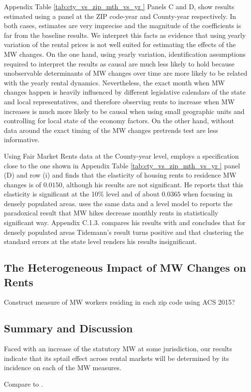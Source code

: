 Appendix Table \ref{tab:cty_vs_zip_mth_vs_yr } Panels C and D, show results estimated
using a panel at the ZIP code-year and County-year respectively. In both cases, estimates
are very imprecise and the magnitude of the coefficients is far from the baseline results. 
We interpret this facts as evidence that using yearly variation of the rental prices is not 
well suited for estimating the effects of the MW changes. On the one hand, using yearly variation, 
identification assumptions required to interpret the results as causal are much less likely 
to hold because unobservable determinants of MW changes over time are more likely to be 
related with the yearly rental dynamics. Nevertheless, the exact month when MW changes 
happen is heavily influenced by different legislative calendars of the state and local 
representatives, and therefore observing rents to increase when MW increases is much 
more likely to be causal when using small geographic units and controlling for local 
state of the economy factors. On the other hand, without data around the exact timing of the 
MW changes pretrends test are less informative.

Using Fair Market Rents data at the County-year level, \textcite{Yamagishi2019} employs a 
specification close to the one shown in Appendix Table \ref{tab:cty_vs_zip_mth_vs_yr } 
panel (D) and row (i) and finds that the elasticity of housing rents to residence MW changes 
is of $0.0150$, although his results are not significant. He reports that this elasticity is 
significant at the 10\% level and of about $0.0365$ when focusing in densely populated areas.
\textcite{Tidemann2018} uses the same data and a level model to reports the paradoxical 
result that MW hikes decrease monthly rents in statistically significant way. \textcite{Yamagishi2019} 
Appendix C.1.3. compares his results with \textcite{Tidemann2018} and concludes that for densely 
populated areas Tidemann's result turns positive and that clustering the standard errors at the
state level renders his results insignificant.


\subsection{The Heterogeneous Impact of MW Changes on Rents}
\label{sec:heterogeneity_results}

Construct measure of MW workers residing in each zip code using ACS 2015?

\subsection{Summary and Discussion}
\label{sec:results_discussion}

Faced with an increase of the statutory MW at some jurisdiction, our results
indicate that its sptail effect across rental markets will be determined by 
its incidence on each of the MW measures.


Compare to \textcite{Yamagishi2019}.
